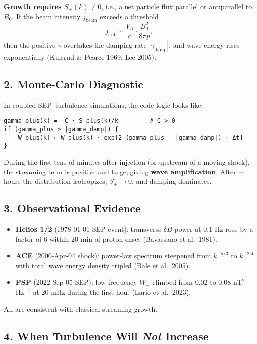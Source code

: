 \textbf{Growth requires $S_{\pm}(k)\neq 0$}, i.e., a net particle flux parallel or antiparallel to $B_0$. If the beam intensity $j_{\text{beam}}$ exceeds a threshold
\[
j_{\text{crit}} \sim \frac{V_A}{c} \cdot \frac{B_0^2}{8\pi p},
\]
then the positive $\gamma$ overtakes the damping rate $|\gamma_{\text{damp}}|$, and wave energy rises exponentially (Kulsrud \& Pearce 1969; Lee 2005).

\subsection*{2. Monte-Carlo Diagnostic}

In coupled SEP–turbulence simulations, the code logic looks like:

\begin{verbatim}
gamma_plus(k) =  C · S_plus(k)/k         # C > 0
if (gamma_plus > |gamma_damp|) {
    W_plus(k) ← W_plus(k) · exp[2 (gamma_plus - |gamma_damp|) · Δt]
}
\end{verbatim}

During the first tens of minutes after injection (or upstream of a moving shock), the streaming term is positive and large, giving \textbf{wave amplification}. After $\sim$hours the distribution isotropizes, $S_\pm \to 0$, and damping dominates.

\subsection*{3. Observational Evidence}

\begin{itemize}
  \item \textbf{Helios 1/2} (1978-01-01 SEP event): transverse $\delta B$ power at 0.1 Hz rose by a factor of 6 within 20 min of proton onset (Bavassano et al.\ 1981).
  \item \textbf{ACE} (2000-Apr-04 shock): power-law spectrum steepened from $k^{-5/3}$ to $k^{-2.4}$ with total wave energy density tripled (Bale et al.\ 2005).
  \item \textbf{PSP} (2022-Sep-05 SEP): low-frequency $W_{-}$ climbed from 0.02 to 0.08 nT$^2$ Hz$^{-1}$ at 20 mHz during the first hour (Lario et al.\ 2023).
\end{itemize}

All are consistent with classical streaming growth.

\subsection*{4. When Turbulence Will \textit{Not} Increase}


